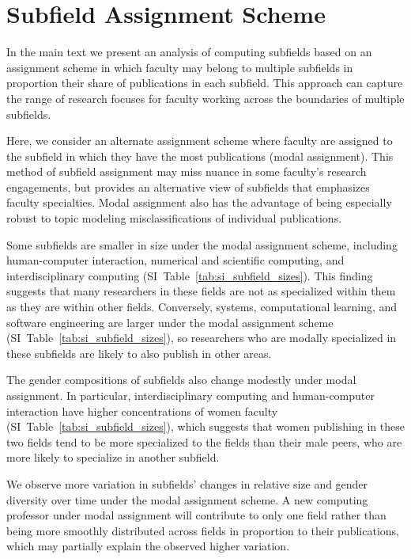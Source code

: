 \documentclass[reprint, twocolumn, aps, nofootinbib, superscriptaddress, longbibliography]{revtex4-1}
\begin{document}
\section{Subfield Assignment Scheme}\label{sec:si_assignment} 

In the main text we present an analysis of computing subfields based on an assignment scheme in which faculty may belong to multiple subfields in proportion their share of publications in each subfield. This approach can capture the range of research focuses for faculty working across the boundaries of multiple subfields. 

Here, we consider an alternate assignment scheme where faculty are assigned to the subfield in which they have the most publications (modal assignment). This method of subfield assignment may miss nuance in some faculty’s research engagements, but provides an alternative view of subfields that emphasizes faculty specialties. Modal assignment also has the advantage of being especially robust to topic modeling misclassifications of individual publications. 

Some subfields are smaller in size under the modal assignment scheme, including human-computer interaction, numerical and scientific computing, and interdisciplinary computing (SI~Table~\ref{tab:si_subfield_sizes}). This finding suggests that many researchers in these fields are not as specialized within them as they are within other fields. Conversely, systems, computational learning, and software engineering are larger under the modal assignment scheme (SI~Table~\ref{tab:si_subfield_sizes}), so researchers who are modally specialized in these subfields are likely to also publish in other areas. 

The gender compositions of subfields also change modestly under modal assignment. In particular, interdisciplinary computing and human-computer interaction have higher concentrations of women faculty (SI~Table~\ref{tab:si_subfield_sizes}), which suggests that women publishing in these two fields tend to be more specialized to the fields than their male peers, who are more likely to specialize in another subfield. 

We observe more variation in subfields’ changes in relative size and gender diversity over time under the modal assignment scheme. A new computing professor under modal assignment will contribute to only one field rather than being more smoothly distributed across fields in proportion to their publications, which may partially explain the observed higher variation. 
\end{document}
